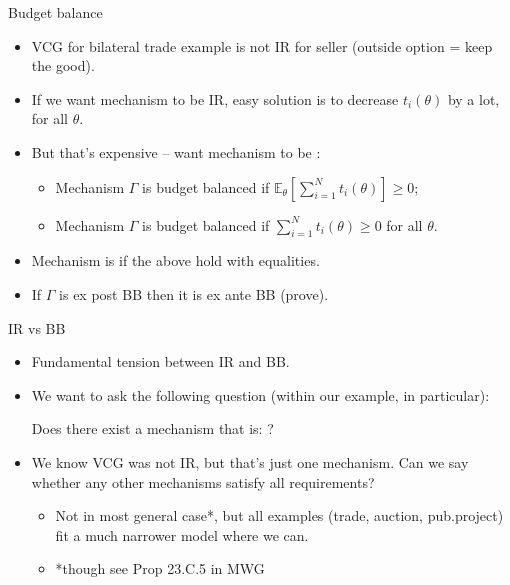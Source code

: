 \documentclass[english,10pt
,aspectratio=169
]{beamer}
\begin{document}
\begin{frame}{Budget balance}
\begin{itemize}
	\item VCG for bilateral trade example is not IR for seller (outside option = keep the good).
	\pause\medskip
	\item If we want mechanism to be IR, easy solution is to decrease $t_i(\theta)$ by a lot, for all $\theta$.
	\item But that's expensive -- want mechanism to be :
	\pause
	\begin{definition}[BB]
		\begin{itemize}
			\item Mechanism $\Gamma$ is  \alert{budget balanced} if $\mathbb{E}_\theta \left[ \sum_{i=1}^N t_i (\theta) \right] \geq 0$;
			\item Mechanism $\Gamma$ is  \alert{budget balanced} if $\sum_{i=1}^N t_i (\theta) \geq 0$ for all $\theta$.
		\end{itemize}
	\end{definition}
	\item Mechanism is  if the above hold with equalities.
	\item If $\Gamma$ is ex post BB then it is ex ante BB (prove).
\end{itemize}
\end{frame}


\begin{frame}{IR vs BB}
\begin{itemize}
	\item Fundamental tension between IR and BB.
	\item We want to ask the following question (within our  example, in particular):
	\begin{exampleblock}{}
		Does there exist a mechanism that is: ?
	\end{exampleblock}
	\pause
	\item We know VCG was not IR, but that's just one mechanism. Can we say whether any other mechanisms satisfy all requirements?
	\begin{itemize}
		\item Not in most general case*, but all examples (trade, auction, pub.project) fit a much narrower model where we can.
		\item *though see Prop 23.C.5 in MWG
	\end{itemize}
\end{itemize}
\end{frame}
\end{document}
